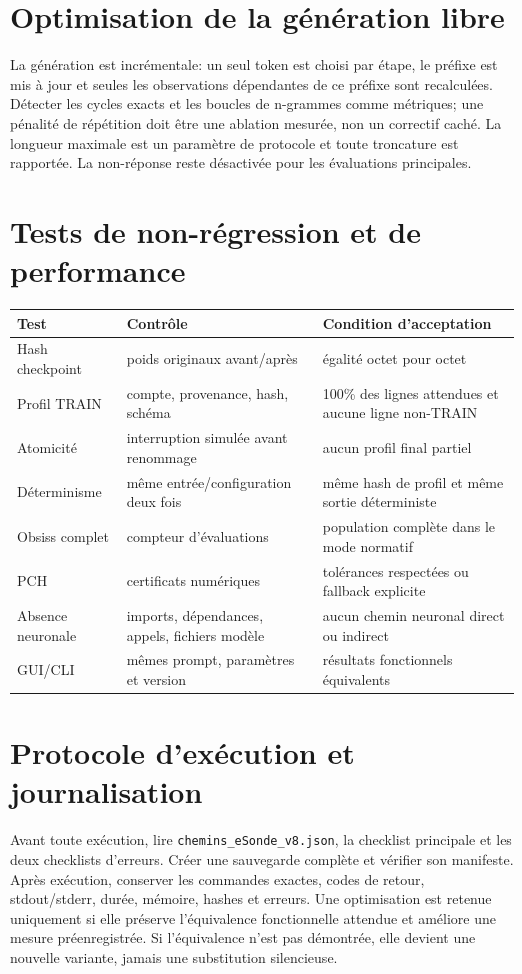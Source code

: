 \documentclass[11pt,a4paper]{report}
\begin{document}
\chapter{Optimisation de la génération libre}
La génération est incrémentale: un seul token est choisi par étape, le préfixe est mis à jour et seules les observations dépendantes de ce préfixe sont recalculées. Détecter les cycles exacts et les boucles de n-grammes comme métriques; une pénalité de répétition doit être une ablation mesurée, non un correctif caché. La longueur maximale est un paramètre de protocole et toute troncature est rapportée. La non-réponse reste désactivée pour les évaluations principales.

\chapter{Tests de non-régression et de performance}
\begin{longtable}{p{.23\linewidth}p{.40\linewidth}p{.29\linewidth}}
\toprule Test & Contrôle & Condition d'acceptation \\
\midrule
Hash checkpoint & poids originaux avant/après & égalité octet pour octet \\
Profil TRAIN & compte, provenance, hash, schéma & 100\% des lignes attendues et aucune ligne non-TRAIN \\
Atomicité & interruption simulée avant renommage & aucun profil final partiel \\
Déterminisme & même entrée/configuration deux fois & même hash de profil et même sortie déterministe \\
Obsiss complet & compteur d'évaluations & population complète dans le mode normatif \\
PCH & certificats numériques & tolérances respectées ou fallback explicite \\
Absence neuronale & imports, dépendances, appels, fichiers modèle & aucun chemin neuronal direct ou indirect \\
GUI/CLI & mêmes prompt, paramètres et version & résultats fonctionnels équivalents \\
\bottomrule
\end{longtable}

\chapter{Protocole d'exécution et journalisation}
Avant toute exécution, lire \texttt{chemins\_eSonde\_v8.json}, la checklist principale et les deux checklists d'erreurs. Créer une sauvegarde complète et vérifier son manifeste. Après exécution, conserver les commandes exactes, codes de retour, stdout/stderr, durée, mémoire, hashes et erreurs. Une optimisation est retenue uniquement si elle préserve l'équivalence fonctionnelle attendue et améliore une mesure préenregistrée. Si l'équivalence n'est pas démontrée, elle devient une nouvelle variante, jamais une substitution silencieuse.
\end{document}
